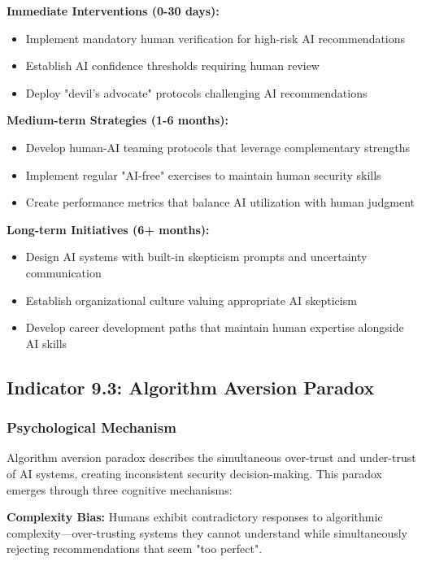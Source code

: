 \documentclass[11pt,a4paper]{article}
\begin{document}
\textbf{Immediate Interventions (0-30 days):}
\begin{itemize}
\item Implement mandatory human verification for high-risk AI recommendations
\item Establish AI confidence thresholds requiring human review
\item Deploy "devil's advocate" protocols challenging AI recommendations
\end{itemize}

\textbf{Medium-term Strategies (1-6 months):}
\begin{itemize}
\item Develop human-AI teaming protocols that leverage complementary strengths
\item Implement regular "AI-free" exercises to maintain human security skills
\item Create performance metrics that balance AI utilization with human judgment
\end{itemize}

\textbf{Long-term Initiatives (6+ months):}
\begin{itemize}
\item Design AI systems with built-in skepticism prompts and uncertainty communication
\item Establish organizational culture valuing appropriate AI skepticism
\item Develop career development paths that maintain human expertise alongside AI skills
\end{itemize}

\subsection{Indicator 9.3: Algorithm Aversion Paradox}

\subsubsection{Psychological Mechanism}

Algorithm aversion paradox describes the simultaneous over-trust and under-trust of AI systems, creating inconsistent security decision-making. This paradox emerges through three cognitive mechanisms:

\textbf{Complexity Bias:} Humans exhibit contradictory responses to algorithmic complexity---over-trusting systems they cannot understand while simultaneously rejecting recommendations that seem "too perfect"\cite{burton2020}.
\end{document}
